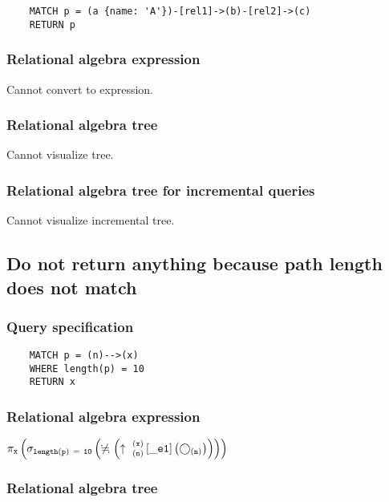 	\begin{lstlisting}
	MATCH p = (a {name: 'A'})-[rel1]->(b)-[rel2]->(c)
	RETURN p
	\end{lstlisting}


	\subsubsection*{Relational algebra expression}

	Cannot convert to expression.

	\subsubsection*{Relational algebra tree}

	Cannot visualize tree.

	\subsubsection*{Relational algebra tree for incremental queries}

	Cannot visualize incremental tree.
	\subsection{Do not return anything because path length does not match}

	\subsubsection*{Query specification}

	\begin{lstlisting}
	MATCH p = (n)-->(x)
	WHERE length(p) = 10
	RETURN x
	\end{lstlisting}


	\subsubsection*{Relational algebra expression}

	$\projection{\var{x}} \left(\selection{\mathtt{length(p)~=~10}} \left(\alldifferent{} \left(\expandout{n}{x}{}{\_e1}{} \left(\getvertices{n}{}\right)\right)\right)\right)$

	\subsubsection*{Relational algebra tree}


